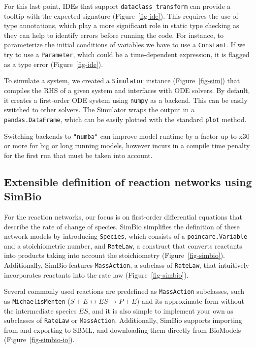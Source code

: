 \documentclass{article}
\begin{document}


For this last point, \acp{IDE} that support \texttt{dataclass\_transform} \cite{debontePEP681Data2021}
can provide a tooltip with the expected signature
(Figure~\ref{fig-ide}). This requires the use of type
annotations, which play a more significant role in static type checking
as they can help to identify errors before running the code. For
instance, to parameterize the initial conditions of variables we have to
use a \texttt{Constant}. If we try to use a \texttt{Parameter}, which
could be a time-dependent expression, it is flagged as a type error
(Figure~\ref{fig-ide}).

To simulate a system, we created a \texttt{Simulator} instance
(Figure~\ref{fig-sim}) that compiles the \ac{RHS} of a given system and interfaces
with \ac{ODE} solvers. By default, it creates a first-order
\ac{ODE} system using \texttt{numpy} as a backend. This can be
easily switched to other solvers. The Simulator wraps the output in a
\texttt{pandas.DataFrame}, which can be easily plotted with the standard
\texttt{plot} method.

Switching backends to \texttt{"numba"} can improve model runtime by a
factor up to x30 or more for big or long running models, however incurs
in a compile time penalty for the first run that must be taken into
account.

\hypertarget{extensible-definition-of-reaction-networks-using-simbio}{%
\subsection{Extensible definition of reaction networks using
SimBio}\label{extensible-definition-of-reaction-networks-using-simbio}}

For the reaction networks, our focus is on first-order differential
equations that describe the rate of change of species. SimBio simplifies
the definition of these network models by introducing \texttt{Species},
which consists of a \texttt{poincare.Variable} and a stoichiometric
number, and \texttt{RateLaw}, a construct that converts reactants into
products taking into account the stoichiometry
(Figure~\ref{fig-simbio}). Additionally, SimBio features
\texttt{MassAction}, a subclass of \texttt{RateLaw}, that intuitively
incorporates reactants into the rate law (Figure~\ref{fig-simbio}).

Several commonly used reactions are predefined as \texttt{MassAction}
subclasses, such as \texttt{MichaelisMenten}
(\(S + E \leftrightarrow ES \rightarrow P + E\)) and its approximate
form without the intermediate species \(ES\), and it is also simple to
implement your own as subclasses of \texttt{RateLaw} or
\texttt{MassAction}. Additionally, SimBio supports importing from and
exporting to \ac{SBML}, and downloading them directly from BioModels
\cite{malik-sheriffBioModels15Years2020} (Figure~\ref{fig-simbio-io}).
\end{document}
